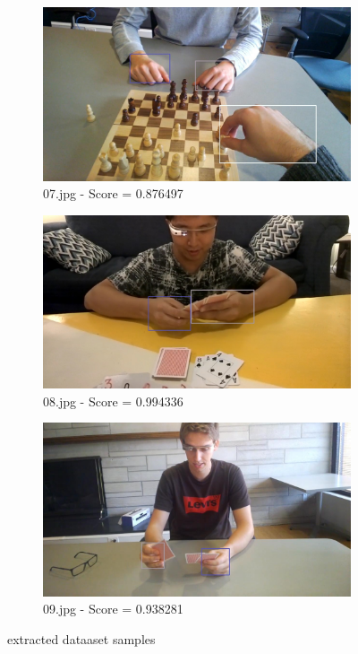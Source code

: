 \begin{figure}
    \centering
    \begin{subfigure}[b]{0.3 \textwidth}
        \centering
        \includegraphics[width=\textwidth]{images/handDetection/07.jpg}
        \caption{07.jpg - Score = 0.876497}
        
    \end{subfigure}
    \hfill
    \begin{subfigure}[b]{0.3\textwidth}
        \centering
        \includegraphics[width=\textwidth]{images/handDetection/08.jpg}
        \caption{08.jpg - Score = 0.994336}
       
    \end{subfigure}
    \begin{subfigure}[b]{0.3\textwidth}
        \centering
        \includegraphics[width=\textwidth]{images/handDetection/09.jpg}
        \caption{09.jpg - Score = 0.938281}
        
    \end{subfigure}
       \caption{extracted dataaset samples}
       
\end{figure}



